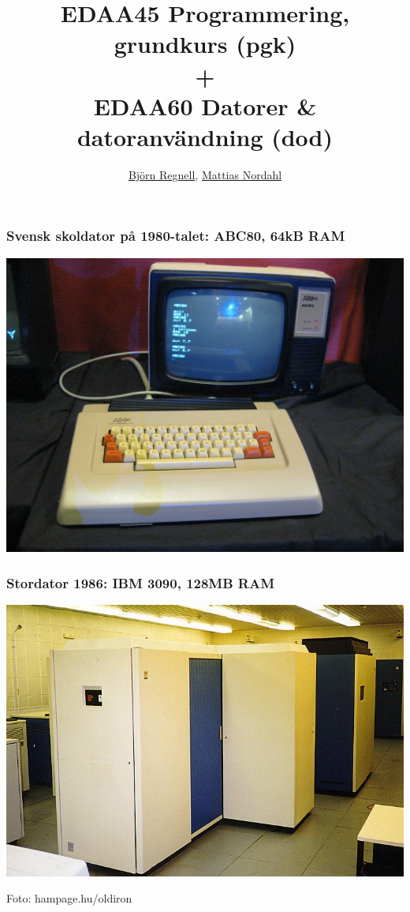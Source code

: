 \documentclass{lecturesimple}
\title[Kort presentation av pgk \& dod, \DateOfShow]{\textbf{EDAA45} Programmering, grundkurs (pgk) \\ + \\ \textbf{EDAA60} Datorer \& datoranvändning (dod)}
\author{\href{http://cs.lth.se/bjorn-regnell}{Björn Regnell}, \href{https://cs.lth.se/nordahl-mattias/}{Mattias Nordahl}}
\institute{\href{http://cs.lth.se}{Datavetenskap}, LTH}
\date{\DateOfShow}
\begin{document}
\frame{\titlepage}

\begin{frame}\frametitle{Svensk skoldator på 1980-talet: ABC80, 64kB RAM}
  \begin{center}
      \includegraphics[width=1.0\textwidth]{../img/abc80}
  \end{center}
  \end{frame}
  
  
  \begin{frame}\frametitle{Stordator 1986: IBM 3090, %
      128MB RAM}
  \begin{center}
      \includegraphics[width=1.0\textwidth]{../img/ibm3090.jpg}
    
      {\fontsize{5}{5}\selectfont\color{gray}
      Foto: hampage.hu/oldiron
    }
  \end{center}
  \end{frame}
    
\end{document}
